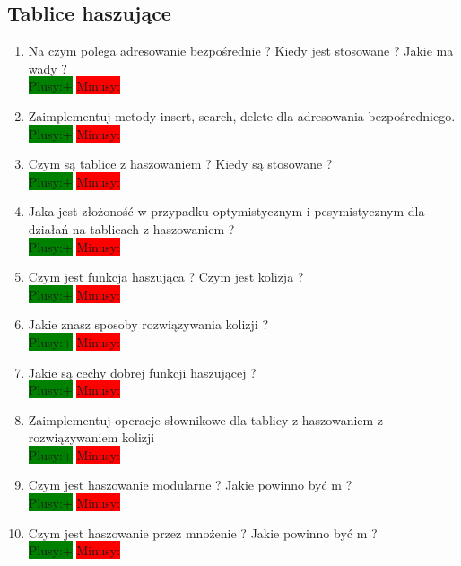 \documentclass[a4paper,11pt]{article}
\begin{document}
\subsection{Tablice haszujące}
\begin{enumerate}
\item Na czym polega adresowanie bezpośrednie ? Kiedy jest stosowane ? Jakie ma wady ? 
\\ \colorbox{green}{Plusy:+} \colorbox{red}{Minusy: } 

\item Zaimplementuj metody insert, search, delete dla adresowania bezpośredniego.
\\ \colorbox{green}{Plusy:+} \colorbox{red}{Minusy: } 

\item Czym są tablice z haszowaniem ? Kiedy są stosowane ? 
\\ \colorbox{green}{Plusy:+} \colorbox{red}{Minusy: } 

\item Jaka jest złożoność w przypadku optymistycznym i pesymistycznym dla działań na tablicach z haszowaniem ?
\\ \colorbox{green}{Plusy:+} \colorbox{red}{Minusy: } 

\item  Czym jest funkcja haszująca ? Czym jest kolizja ?
\\ \colorbox{green}{Plusy:+} \colorbox{red}{Minusy: } 

\item Jakie znasz sposoby rozwiązywania kolizji ? 
\\ \colorbox{green}{Plusy:+} \colorbox{red}{Minusy: } 

\item Jakie są cechy dobrej funkcji haszującej ? 
\\ \colorbox{green}{Plusy:+} \colorbox{red}{Minusy: } 

\item Zaimplementuj operacje słownikowe dla tablicy z haszowaniem z rozwiązywaniem kolizji
\\ \colorbox{green}{Plusy:+} \colorbox{red}{Minusy: } 

\item Czym jest haszowanie modularne ? Jakie powinno być m ? 
\\ \colorbox{green}{Plusy:+} \colorbox{red}{Minusy: } 

\item Czym jest haszowanie przez mnożenie ? Jakie powinno być m ? 
\\ \colorbox{green}{Plusy:+} \colorbox{red}{Minusy: } 


\end{enumerate}
\end{document}
